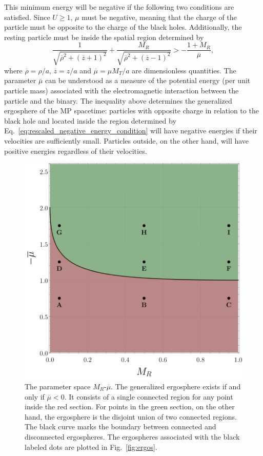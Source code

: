 This minimum energy will be negative if the following two conditions are satisfied. Since $U \ge 1$, $\mu$ must be negative, meaning that the charge of the particle must be opposite to the charge of the black holes. Additionally, the resting particle must be inside the spatial region determined by
\begin{equation} \label{eq:rescaled_negative_energy_condition}
    \frac{1}{\sqrt{\overline{\rho}^2 + (\overline{z}+1)^2}} + \frac{M_R}{\sqrt{\overline{\rho}^2 + (\overline{z}-1)^2}} > - \frac{1+M_R}{\overline{\mu}},
\end{equation}
where $\overline{\rho} = \rho/a$, $\overline{z} = z/a$ and $\overline \mu =  \mu M_T/a$ are dimensionless quantities. The parameter $\overline \mu$ can be understood as a measure of the potential energy (per unit particle mass) associated with the electromagnetic interaction between the particle and the binary.
The inequality above determines the generalized ergosphere of the MP spacetime: particles with opposite charge in relation to the black hole and located inside the region determined by Eq.~\eqref{eq:rescaled_negative_energy_condition} will have negative energies if their velocities are sufficiently small. Particles outside, on the other hand, will have positive energies regardless of their velocities.

\begin{figure}[!htbp]
    \centering
    \includegraphics[scale=0.70]{img/penrose_binaries/fig1.pdf}
    \caption{The parameter space $M_R$-$\overline \mu$. The generalized ergosphere exists if and only if $\overline \mu < 0$. It consists of a single connected region for any point inside the red section. For points in the green section, on the other hand, the ergosphere is the disjoint union of two connected regions. The black curve marks the boundary between connected and disconnected ergospheres. The ergospheres associated with the black labeled dots are plotted in Fig.~\ref{fig:ergos}.}
    \label{fig:regions}
\end{figure}

